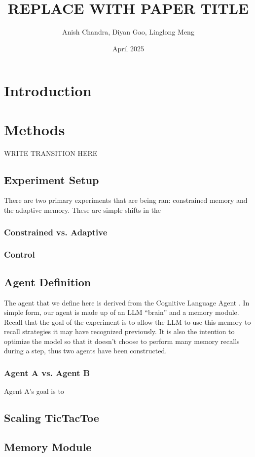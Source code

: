 \documentclass[12pt]{article}
\title{REPLACE WITH PAPER TITLE}
\author{Anish Chandra, Diyan Gao, Linglong Meng}
\date{April 2025}
\begin{document}
\maketitle

\section{Introduction}

\section{Methods}
WRITE TRANSITION HERE
\subsection{Experiment Setup}
There are two primary experiments that are being ran: constrained memory and the adaptive memory. These are simple shifts in the 
\subsubsection{Constrained vs. Adaptive}
\subsubsection{Control}
\subsection{Agent Definition}
The agent that we define here is derived from the Cognitive Language Agent \cite{sumers2024cognitivearchitectureslanguageagents}. In simple form, our agent is made up of an LLM ``brain'' and a memory module. Recall that the goal of the experiment is to allow the LLM to use this memory to recall strategies it may have recognized previously. It is also the intention to optimize the model so that it doesn't choose to perform many memory recalls during a step, thus two agents have been constructed.
\subsubsection{Agent A vs. Agent B}
Agent A's goal is to 
\subsection{Scaling TicTacToe}
\subsection{Memory Module}
\end{document}
